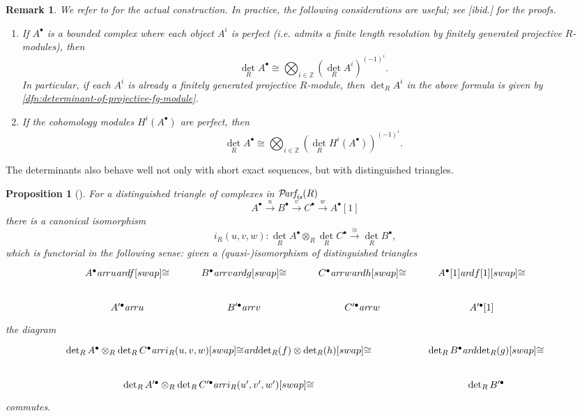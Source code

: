\documentclass[10pt,a4paper,oneside,draft]{article}
\newcommand{\ZZ}{\mathbb{Z}}
\newcommand{\Parf}{\mathcal{P}\!\text{\it arf}}
\renewcommand{\det}{\operatorname{det}}
\newcommand{\ar}{\text{\it ar}}
\newcommand{\is}{\text{\it is}}
\theoremstyle{myplain}
\newtheorem{proposition}[theorem]{Proposition}
\theoremstyle{mydefinition}
\newtheorem{remark}[theorem]{Remark}
\numberwithin{equation}{section}
\begin{document}
\begin{appendices}
\begin{remark}
  We refer to \cite{Knudsen-Mumford-1976} for the actual construction.
  In practice, the following considerations are useful; see [ibid.] for the
  proofs.

  \begin{enumerate}
  \item[1)] If $A^\bullet$ is a bounded complex where each object $A^i$ is
    perfect (i.e. admits a finite length resolution by finitely generated
    projective $R$-modules), then
    $$\det_R A^\bullet \cong \bigotimes_{i\in \ZZ} (\det_R A^i)^{(-1)^i}.$$
    In particular, if each $A^i$ is already a finitely generated projective
    $R$-module, then $\det_R A^i$ in the above formula is given by
    \ref{dfn:determinant-of-projective-fg-module}.

  \item[2)] If the cohomology modules $H^i (A^\bullet)$ are perfect, then
    \[ \det_R A^\bullet \cong
      \bigotimes_{i\in \ZZ} (\det_R H^i (A^\bullet))^{(-1)^i}. \]
  \end{enumerate}
\end{remark}

The determinants also behave well not only with short exact sequences, but with
distinguished triangles.

\begin{proposition}[{\cite[Proposition~7]{Knudsen-Mumford-1976}}]
  \label{prop:det-and-isos-of-triangles}
  For a distinguished triangle of complexes in $\Parf_\is (R)$
  \[ A^\bullet \xrightarrow{u} B^\bullet \xrightarrow{v} C^\bullet
    \xrightarrow{w} A^\bullet [1] \]
  there is a canonical isomorphism
  \[ i_R (u,v,w)\colon \det_R A^\bullet \otimes_R \det_R C^\bullet
    \xrightarrow{\cong} \det_R B^\bullet, \]
  which is functorial in the following sense: given a (quasi-)isomorphism of
  distinguished triangles
  \[ \begin{tikzcd}
      A^\bullet \ar{r}{u}\ar{d}{f}[swap]{\cong} & B^\bullet \ar{r}{v}\ar{d}{g}[swap]{\cong} & C^\bullet \ar{r}{w}\ar{d}{h}[swap]{\cong} & A^\bullet [1]\ar{d}{f[1]}[swap]{\cong} \\
      A'^\bullet \ar{r}{u} & B'^\bullet \ar{r}{v} & C'^\bullet \ar{r}{w} & A'^\bullet [1]
    \end{tikzcd} \]
  the diagram
  \[ \begin{tikzcd}[column sep=5em]
      \det_R A^\bullet \otimes_R \det_R C^\bullet \ar{r}{i_R (u,v,w)}[swap]{\cong}\ar{d}{\det_R (f) \otimes \det_R (h)}[swap]{\cong} & \det_R B^\bullet\ar{d}{\det_R (g)}[swap]{\cong} \\
      \det_R A'^\bullet \otimes_R \det_R C'^\bullet \ar{r}{i_R (u',v',w')}[swap]{\cong} & \det_R B'^\bullet
    \end{tikzcd} \]
  commutes.
\end{proposition}


\end{appendices}
\end{document}
